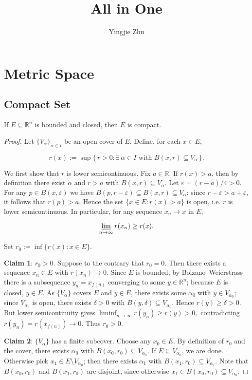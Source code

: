 \documentclass[11pt,a4paper]{article}
\title{All in One}
\author{Yingjie Zhu}
\begin{document}
\section{Metric Space}

\subsection{Compact Set}

\begin{thm}
      If $E \subseteq \mathbb{R}^n$ is bounded and closed, then $E$ is compact.
\end{thm}

\begin{proof}
Let $\{V_\alpha\}_{\alpha \in I}$ be an open cover of $E$. Define, for each $x \in E$,

\[
  r(x) := \sup\{\, r > 0 : \exists\, \alpha \in I \text{ with } B(x,r) \subseteq V_\alpha \,\}.
\]


We first show that $r$ is lower semicontinuous. Fix $a \in \mathbb{R}$. 
If $r(x) > a$,
then by definition there exist $\alpha$ and $r>a$ with $B(x,r) \subseteq V_\alpha$.
Let $\varepsilon = (r-a)/4 > 0$. For any $p \in B(x,\varepsilon)$ we have
$B(p,r-\varepsilon) \subseteq B(x,r) \subseteq V_\alpha$; since $r-\varepsilon > a+\varepsilon$,
it follows that $r(p) > a$. Hence the set $\{x \in E : r(x) > a\}$ is open, i.e. $r$ is
lower semicontinuous. In particular, for any sequence $x_n \to x$ in $E$,

\[
  \varliminf_{n \to \infty} r(x_n) \ge r(x).
\]

Set $r_0 := \inf\{ r(x) : x \in E \}$.

\textbf{Claim 1}: $r_0 > 0$. Suppose to the contrary that $r_0 = 0$. Then there exists a
sequence $x_n \in E$ with $r(x_n) \to 0$. Since $E$ is bounded, by Bolzano–Weierstrass
there is a subsequence $y_n = x_{f(n)}$ converging to some $y \in \mathbb{R}^n$; because
$E$ is closed, $y \in E$. As $\{V_\alpha\}$ covers $E$ and $y \in E$, there exists some
$\alpha_0$ with $y \in V_{\alpha_0}$; since $V_{\alpha_0}$ is open, there exists
$\delta>0$ with $B(y,\delta) \subseteq V_{\alpha_0}$. Hence $r(y) \ge \delta > 0$.
But lower semicontinuity gives
$
  \liminf_{n \to \infty} r(y_n) \ge r(y) > 0,
$
contradicting $r(y_n)=r(x_{f(n)}) \to 0$. Thus $r_0>0$.

\textbf{Claim 2}: $\{V_\alpha\}$ has a finite subcover. Choose any $x_0 \in E$.
By definition of $r_0$ and the cover, there exists $\alpha_0$ with
$B(x_0,r_0) \subseteq V_{\alpha_0}$. If $E \subseteq V_{\alpha_0}$, we are done.
Otherwise pick $x_1 \in E \setminus V_{\alpha_0}$; then there exists $\alpha_1$
with $B(x_1,r_0) \subseteq V_{\alpha_1}$. Note that $B(x_0,r_0)$ and $B(x_1,r_0)$
are disjoint, since otherwise $x_1 \in B(x_0,r_0) \subseteq V_{\alpha_0}$.


\end{proof}
\end{document}
